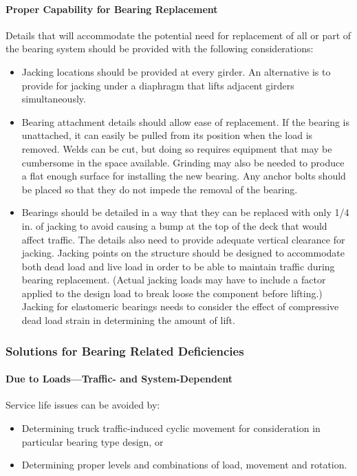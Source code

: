 \paragraph{Proper Capability for Bearing Replacement}
Details that will accommodate the potential need for replacement of all or part of the bearing system should be
provided with the following considerations:
\begin{itemize}
  \item Jacking locations should be provided at every girder. An alternative is to provide for jacking under a
  diaphragm that lifts adjacent girders simultaneously.
  \item Bearing attachment details should allow ease of replacement. If the bearing is unattached, it can easily be
  pulled from its position when the load is removed. Welds can be cut, but doing so requires equipment that
  may be cumbersome in the space available. Grinding may also be needed to produce a flat enough surface for
  installing the new bearing. Any anchor bolts should be placed so that they do not impede the removal of the
  bearing.
  \item Bearings should be detailed in a way that they can be replaced with only 1/4 in. of jacking to avoid causing a
  bump at the top of the deck that would affect traffic. The details also need to provide adequate vertical
  clearance for jacking. Jacking points on the structure should be designed to accommodate both dead load
  and live load in order to be able to maintain traffic during bearing replacement. (Actual jacking loads may
  have to include a factor applied to the design load to break loose the component before lifting.) Jacking for
  elastomeric bearings needs to consider the effect of compressive dead load strain in determining the amount
  of lift.
\end{itemize}

\subsubsection{Solutions for Bearing Related Deficiencies}
\paragraph{Due to Loads—Traffic- and System-Dependent}
Service life issues can be avoided by:

\begin{itemize}
  \item Determining truck traffic-induced cyclic movement for consideration in particular bearing type design, or
  \item Determining proper levels and combinations of load, movement and rotation.
\end{itemize}

